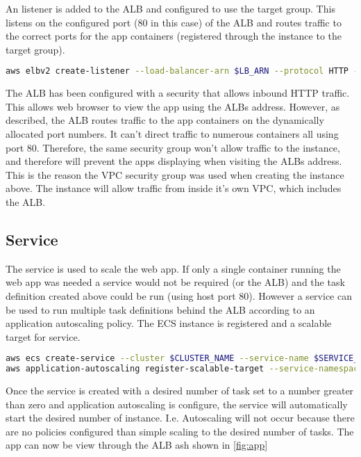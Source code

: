 An listener is added to the ALB and configured to use the target group. This listens on the configured port (80 in this case) of the ALB and routes traffic to the correct ports for the app containers (registered through the instance to the target group).
\begin{lstlisting}[language=bash]
aws elbv2 create-listener --load-balancer-arn $LB_ARN --protocol HTTP --port 80 --default-actions Type=forward,TargetGroupArn=$TG_ARN
\end{lstlisting}
The ALB has been configured with a security that allows inbound HTTP traffic. This allows web browser to view the app using the ALBs address. However, as described, the ALB routes traffic to the app containers on the dynamically allocated port numbers. It can't direct traffic to numerous containers all using port 80. Therefore, the same security group won't allow traffic to the instance, and therefore will prevent the apps displaying when visiting the ALBs address. This is the reason the VPC security group was used when creating the instance above. The instance will allow traffic from inside it's own VPC, which includes the ALB.

\subsection{Service}
The service is used to scale the web app. If only a single container running the web app was needed a service would not be required (or the ALB) and the task definition created above could be run (using host port 80). However a service can be used to run multiple task definitions behind the ALB according to an application autoscaling policy. The ECS instance is registered and a scalable target for service.
\begin{lstlisting}[language=bash]
aws ecs create-service --cluster $CLUSTER_NAME --service-name $SERVICE_NAME --task-definition $TASK_DEF:$REVISION --load-balancers targetGroupArn=$TG_ARN,containerName=$CONTAINER_NAME,containerPort=80 --desired-count 2 --role $ECS_SERVICE_ROLE
aws application-autoscaling register-scalable-target --service-namespace ecs --resource-id service/$CLUSTER_NAME/$SERVICE_NAME --scalable-dimension ecs:service:DesiredCount --min-capacity 1 --max-capacity 3 --role-arn $APP_AUTOSCALING_ROLE_ARN
\end{lstlisting}
Once the service is created with a desired number of task set to a number greater than zero and application autoscaling is configure, the service will automatically start the desired number of instance. I.e. Autoscaling will not occur because there are no policies configured than simple scaling to the desired number of tasks. The app can now be view through the ALB ash shown in \autoref{fig:app}


